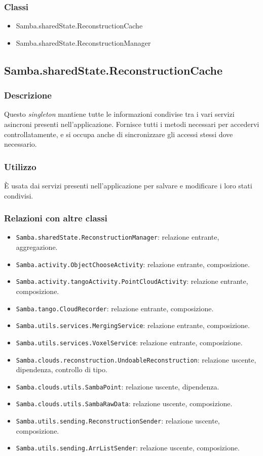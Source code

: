 \subsubsection{Classi}
\begin{itemize}
	\item Samba.sharedState.ReconstructionCache
	\item Samba.sharedState.ReconstructionManager
\end{itemize}

\subsection{Samba.sharedState.ReconstructionCache}
\subsubsection{Descrizione}
Questo \emph{singleton} mantiene tutte le informazioni condivise tra i vari servizi asincroni presenti nell'applicazione. Fornisce tutti i metodi necessari per accedervi controllatamente, e si occupa anche di sincronizzare gli accessi stessi dove necessario.
\subsubsection{Utilizzo}
È usata dai servizi presenti nell'applicazione per salvare e modificare i loro stati condivisi.
\subsubsection{Relazioni con altre classi}
\begin{itemize}
	\item \texttt{Samba.sharedState.ReconstructionManager}: relazione entrante, aggregazione.
	\item \texttt{Samba.activity.ObjectChooseActivity}: relazione entrante, composizione.
	\item \texttt{Samba.activity.tangoActivity.PointCloudActivity}: relazione entrante, composizione.
	\item \texttt{Samba.tango.CloudRecorder}: relazione entrante, composizione.
	\item \texttt{Samba.utils.services.MergingService}: relazione entrante, composizione.
	\item \texttt{Samba.utils.services.VoxelService}: relazione entrante, composizione.	
	\item \texttt{Samba.clouds.reconstruction.UndoableReconstruction}: relazione uscente, dipendenza, controllo di tipo.
	\item \texttt{Samba.clouds.utils.SambaPoint}: relazione uscente, dipendenza.
	\item \texttt{Samba.clouds.utils.SambaRawData}: relazione uscente, composizione.
	\item \texttt{Samba.utils.sending.ReconstructionSender}: relazione uscente, composizione.
	\item \texttt{Samba.utils.sending.ArrListSender}: relazione uscente, composizione.	
\end{itemize}

